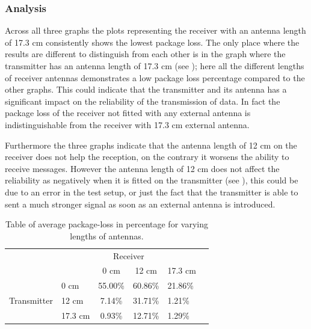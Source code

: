 \subsubsection*{Analysis}
Across all three graphs the plots representing the receiver with an antenna length of 17.3 cm consistently shows the lowest package loss. 
The only place where the results are different to distinguish from each other is in the graph where the transmitter has an antenna length of 17.3 cm (see ); here all the different lengths of receiver antennas demonstrates a low package loss percentage compared to the other graphs.
This could indicate that the transmitter and its antenna has a significant impact on the reliability of the transmission of data.
In fact the package loss of the receiver not fitted with any external antenna is indistinguishable from the receiver with 17.3 cm external antenna.

Furthermore the three graphs indicate that the antenna length of 12 cm on the receiver does not help the reception, on the contrary it worsens the ability to receive messages.
However the antenna length of 12 cm does not affect the reliability as negatively when it is fitted on the transmitter (see ), this could be due to an error in the test setup, or just the fact that the transmitter is able to sent a much stronger signal as soon as an external antenna is introduced.

\begin{table}[ht]
\centering
\begin{tabular}{llclll}
 & \multicolumn{4}{c}{Receiver} &    \hspace{40pt}      \\ \cline{2-5}
\multicolumn{1}{l|}{} & \multicolumn{1}{l|}{} & \multicolumn{1}{c|}{0 cm} & \multicolumn{1}{c|}{12 cm} & \multicolumn{1}{l|}{17.3 cm} &  \\ \cline{2-5}
\multicolumn{1}{l|}{} & \multicolumn{1}{l|}{0 cm} & \multicolumn{1}{c|}{55.00\%} & \multicolumn{1}{l|}{60.86\%} & \multicolumn{1}{l|}{21.86\%} &  \\ \cline{2-5}
\multicolumn{1}{l|}{Transmitter} & \multicolumn{1}{l|}{12 cm} & \multicolumn{1}{c|}{7.14\%} & \multicolumn{1}{l|}{31.71\%} & \multicolumn{1}{l|}{1.21\%} &  \\ \cline{2-5}
\multicolumn{1}{l|}{} & \multicolumn{1}{l|}{17.3 cm} & \multicolumn{1}{c|}{0.93\%} & \multicolumn{1}{l|}{12.71\%} & \multicolumn{1}{l|}{1.29\%} &  \\ \cline{2-5}
\end{tabular}
\caption{Table of average package-loss in percentage for varying lengths of antennas.}
\label{tbl:packageloss}
\end{table}

